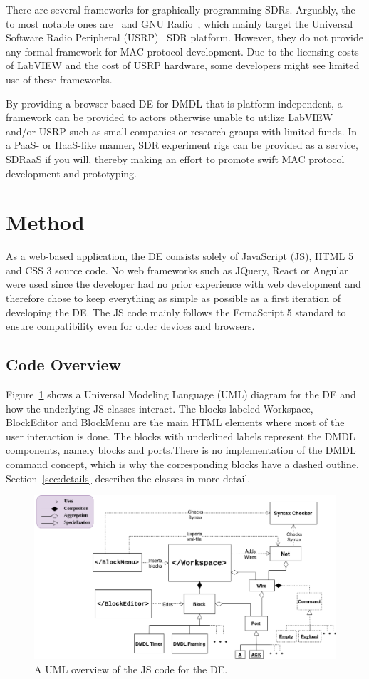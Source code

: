 \documentclass[journal,comsoc]{IEEEtran}
\begin{document}
There are several frameworks for graphically programming SDRs. Arguably, the to most notable
ones are~\cite{labview} and GNU Radio~\cite{gr}, which mainly target the
Universal Software Radio Peripheral (USRP)~\cite{usrp} SDR platform. However, they do not
provide any formal framework for MAC protocol development. Due to the licensing costs of LabVIEW
and the cost of USRP hardware, some developers might see limited use of these frameworks.

By providing a browser-based DE for DMDL that is platform independent, a framework can be provided
to actors otherwise unable to utilize LabVIEW and/or USRP such as small companies or research
groups with limited funds. In a PaaS- or HaaS-like manner, SDR experiment rigs can be provided as a
service, SDRaaS if you will, thereby making an effort to promote swift MAC protocol development and
prototyping.

\section{Method}
As a web-based application, the DE consists solely of JavaScript (JS), HTML 5 and CSS 3 source
code. No web frameworks such as JQuery, React or Angular were used since the developer had no
prior experience with web development and therefore chose to keep everything as simple as possible
as a first iteration of developing the DE. The JS code mainly follows the EcmaScript 5 standard to
ensure compatibility even for older devices and browsers.

\subsection{Code Overview}
Figure~\ref{fig:uml} shows a Universal Modeling Language (UML) diagram for the DE and how the
underlying JS classes interact. The blocks labeled Workspace, BlockEditor and BlockMenu are the
main HTML elements where most of the user interaction is done. The blocks with underlined labels
represent the DMDL components, namely blocks and ports.There is no implementation of the DMDL
command concept, which is why the corresponding blocks have a dashed outline.
Section~\ref{sec:details} describes the classes in more detail.
\begin{figure}[!t]
\centering
\includegraphics[width=\columnwidth]{dmdl-editor.png}
\caption{A UML overview of the JS code for the DE.}
\label{fig:uml}
\end{figure}
\end{document}
